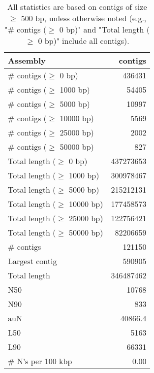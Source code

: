 \documentclass[12pt,a4paper]{article}
\begin{document}
\begin{table}[ht]
\begin{center}
\caption{All statistics are based on contigs of size $\geq$ 500 bp, unless otherwise noted (e.g., "\# contigs ($\geq$ 0 bp)" and "Total length ($\geq$ 0 bp)" include all contigs).}
\begin{tabular}{|l*{1}{|r}|}
\hline
Assembly & contigs \\ \hline
\# contigs ($\geq$ 0 bp) & 436431 \\ \hline
\# contigs ($\geq$ 1000 bp) & 54405 \\ \hline
\# contigs ($\geq$ 5000 bp) & 10997 \\ \hline
\# contigs ($\geq$ 10000 bp) & 5569 \\ \hline
\# contigs ($\geq$ 25000 bp) & 2002 \\ \hline
\# contigs ($\geq$ 50000 bp) & 827 \\ \hline
Total length ($\geq$ 0 bp) & 437273653 \\ \hline
Total length ($\geq$ 1000 bp) & 300978467 \\ \hline
Total length ($\geq$ 5000 bp) & 215212131 \\ \hline
Total length ($\geq$ 10000 bp) & 177458573 \\ \hline
Total length ($\geq$ 25000 bp) & 122756421 \\ \hline
Total length ($\geq$ 50000 bp) & 82206659 \\ \hline
\# contigs & 121150 \\ \hline
Largest contig & 590905 \\ \hline
Total length & 346487462 \\ \hline
N50 & 10768 \\ \hline
N90 & 833 \\ \hline
auN & 40866.4 \\ \hline
L50 & 5163 \\ \hline
L90 & 66331 \\ \hline
\# N's per 100 kbp & 0.00 \\ \hline
\end{tabular}
\end{center}
\end{table}
\end{document}

